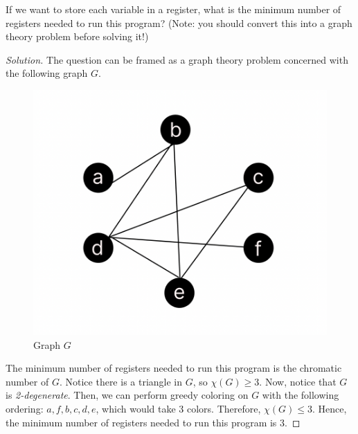 \documentclass{article}
\begin{document}
If we want to store each variable in a register, what is the minimum number of registers needed to run this program? (Note: you should convert this into a graph theory problem before solving it!)
\begin{proof}[Solution]
    The question can be framed as a graph theory problem concerned with the following graph $G$.
    \begin{figure}[htb!]
        \centering
        \includegraphics[scale=0.3]{hw6-3.png}
        \caption{Graph $G$}
    \end{figure}

    The minimum number of registers needed to run this program is the chromatic number of $G$.
    Notice there is a triangle in $G$, so $\chi(G) \ge 3$.
    Now, notice that $G$ is \emph{2-degenerate}. 
    Then, we can perform greedy coloring on $G$ with the following ordering: $a, f, b, c, d, e$, which would take 3 colors.
    Therefore, $\chi(G) \le 3$.
    Hence, the minimum number of registers needed to run this program is 3.
\end{proof}

\bigbreak
\end{document}
